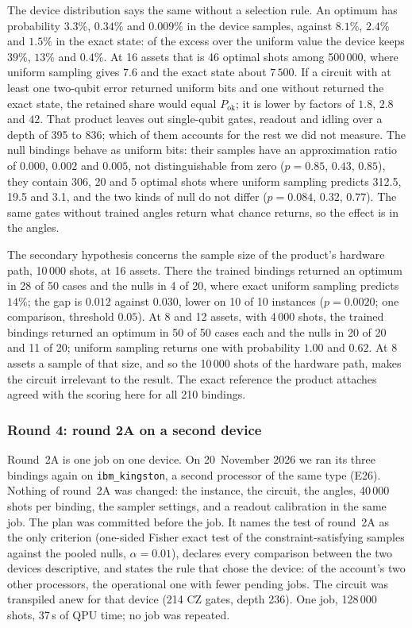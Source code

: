 \documentclass[11pt,a4paper]{article}
\begin{document}
The device distribution says the same without a selection rule. An optimum
has probability $3.3\%$, $0.34\%$ and $0.009\%$ in the device samples,
against $8.1\%$, $2.4\%$ and $1.5\%$ in the exact state: of the excess over
the uniform value the device keeps $39\%$, $13\%$ and $0.4\%$. At 16 assets
that is 46 optimal shots among 500\,000, where uniform sampling gives $7.6$
and the exact state about $7\,500$. If a circuit with at least one two-qubit
error returned uniform bits and one without returned the exact state, the
retained share would equal $P_{\mathrm{ok}}$; it is lower by factors of
$1.8$, $2.8$ and $42$. That product leaves out single-qubit gates, readout
and idling over a depth of 395 to 836; which of them accounts for the rest
we did not measure. The null bindings behave as uniform bits: their samples
have an approximation ratio of $0.000$, $0.002$ and $0.005$, not
distinguishable from zero ($p = 0.85$, $0.43$, $0.85$), they contain 306, 20
and 5 optimal shots where uniform sampling predicts 312.5, 19.5 and 3.1, and
the two kinds of null do not differ ($p = 0.084$, $0.32$, $0.77$). The same
gates without trained angles return what chance returns, so the effect is in
the angles.

The secondary hypothesis concerns the sample size of the product's hardware
path, 10\,000 shots, at 16 assets. There the trained bindings returned an
optimum in 28 of 50 cases and the nulls in 4 of 20, where exact uniform
sampling predicts $14\%$; the gap is $0.012$ against $0.030$, lower on 10 of
10 instances ($p = 0.0020$; one comparison, threshold $0.05$). At 8 and 12
assets, with 4\,000 shots, the trained bindings returned an optimum in 50 of
50 cases each and the nulls in 20 of 20 and 11 of 20; uniform sampling
returns one with probability $1.00$ and $0.62$. At 8 assets a sample of
that size, and so the 10\,000 shots of the hardware path, makes the circuit
irrelevant to the result. The exact
reference the product attaches agreed with the scoring here for all 210
bindings.

\subsubsection{Round 4: round 2A on a second device}
\label{sec:res-hw4}

Round~2A is one job on one device. On 20~November 2026 we ran its three
bindings again on \texttt{ibm\_kingston}, a second processor of the same
type (E26). Nothing of round~2A was changed: the instance, the circuit, the
angles, 40\,000 shots per binding, the sampler settings, and a readout
calibration in the same job. The plan was committed before the job. It
names the test of round~2A as the only criterion (one-sided Fisher exact
test of the constraint-satisfying samples against the pooled nulls,
$\alpha = 0.01$), declares every comparison between the two devices
descriptive, and states the rule that chose the device: of the account's
two other processors, the operational one with fewer pending jobs. The
circuit was transpiled anew for that device (214 CZ gates, depth 236). One
job, 128\,000 shots, 37\,s of QPU time; no job was repeated.
\end{document}
